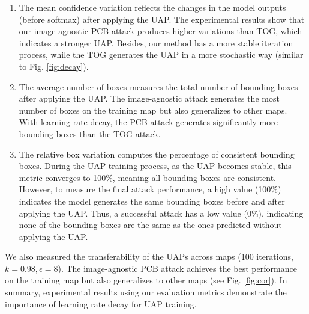 \begin{enumerate}
    \item The mean confidence variation reflects the changes in the model outputs (before softmax) after applying the UAP. The experimental results show that our image-agnostic PCB attack produces higher variations than TOG, which indicates a stronger UAP. Besides, our method has a more stable iteration process, while the TOG generates the UAP in a more stochastic way (similar to Fig. \ref{fig:decay}).
    \item The average number of boxes measures the total number of bounding boxes after applying the UAP. The image-agnostic attack generates the most number of boxes on the training map but also generalizes to other maps. With learning rate decay, the PCB attack generates significantly more bounding boxes than the TOG attack.
    \item The relative box variation computes the percentage of consistent bounding boxes. During the UAP training process, as the UAP becomes stable, this metric converges to 100\%, meaning all bounding boxes are consistent. However, to measure the final attack performance, a high value (100\%) indicates the model generates the same bounding boxes before and after applying the UAP. Thus, a successful attack has a low value (0\%), indicating none of the bounding boxes are the same as the ones predicted without applying the UAP.
\end{enumerate}

We also measured the transferability of the UAPs across maps (100 iterations, $k=0.98, \epsilon=8$). The image-agnostic PCB attack achieves the best performance on the training map but also generalizes to other maps (see Fig. \ref{fig:cor}). In summary, experimental results using our evaluation metrics demonstrate the importance of learning rate decay for UAP training.


\clearpage

\null
\vfill

